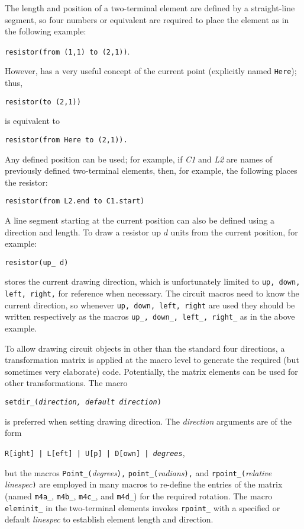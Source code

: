 The length and position of a two-terminal element
are defined by a straight-line segment, so
four numbers or equivalent
are required to place the element as in the following example:
\par
{\tt resistor(from (1,1) to (2,1))}.

\noindent
However, \pic has a very useful concept of the current point (explicitly
named {\tt Here}); thus,
\par
{\tt resistor(to (2,1))}
\par
\noindent
is equivalent to
\par
{\tt resistor(from Here to (2,1)).}

Any defined position can be used; for example, if {\sl C1} and {\sl L2}
are names of previously defined two-terminal elements,
then, for example, the following places the resistor: 
\par
{\tt resistor(from L2.end to C1.start)}

A line segment starting at the current position can also be defined using
a direction and length.
To draw a resistor up $d$ units from the current position, for example:
\par
{\tt resistor(up\_ d)}

\Pic stores the current drawing direction,
which is unfortunately limited to {\tt up, down, left, right,}
for reference when necessary.
The circuit macros need to know the current direction, so
whenever {\tt up, down, left, right} are used they should be written
respectively as the macros {\tt up\_, down\_, left\_, right\_} as in
the above example.

To allow drawing circuit objects in other than the standard four directions,
a transformation matrix
is applied at the macro level to generate the required
(but sometimes very elaborate) \pic code.
Potentially, the matrix elements can be used for other transformations.
The macro

{\tt setdir\_({\sl direction, default direction})}

\noindent
is preferred when setting drawing direction.  The {\sl direction} arguments
are of the form

{\tt R[ight] | L[eft] | U[p] | D[own] | {\sl degrees}},

\noindent
but the macros
{\tt Point\_(}{\sl degrees}{\tt ),}
{\tt point\_(}{\sl radians}{\tt ),}
and {\tt rpoint\_(}{\sl relative linespec}{\tt )} are employed in many macros
to re-define the entries
of the matrix
(named {\tt m4a\_}, {\tt m4b\_}, {\tt m4c\_}, and {\tt m4d\_})
for the required rotation.
The macro {\tt eleminit\_} in the two-terminal elements invokes
{\tt rpoint\_} with a specified or default {\sl linespec}
to establish element length and direction.

